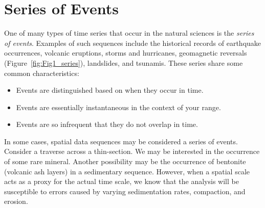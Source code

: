 \section{Series of Events}
\label{sec:seriestest}
	One of many types of time series that occur in the natural sciences is the \emph{series of events}.  
Examples of such sequences include the historical records of earthquake occurrences,  volcanic 
eruptions, storms and hurricanes, geomagnetic reversals (Figure~\ref{fig:Fig1_series}), landslides, and tsunamis.  These series
share some common characteristics:
\begin{itemize}
\item	Events are distinguished based on when they occur in time.
\item	Events are essentially instantaneous in the context of your range.
\item	Events are so infrequent that they do not overlap in time.
\end{itemize}
In some cases, spatial data sequences may be considered a series of events.  Consider a traverse 
across a thin-section.  We may be interested in the occurrence of some rare mineral.  Another 
possibility may be the occurrence of bentonite (volcanic ash layers) in a sedimentary sequence.  
However, when a spatial scale acts as a proxy for the actual time scale, we know that the analysis 
will be susceptible to errors caused by varying sedimentation rates, compaction, and erosion.

